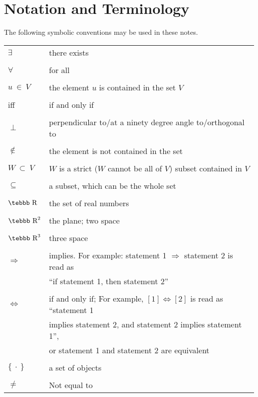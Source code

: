 \pagestyle{myheadings}  
\section*{Notation and Terminology}\label{noter1}

\bigskip

 \quad \quad The following symbolic conventions may be used in these notes.\\
\smallskip

{\tabcolsep=5mm
\begin{tabular}{ll}

  $\exists$ & there exists \\
  &\\
  $ \forall$ & for all \\
  &\\
  $u \ \in \ V $ & the element $u$ is contained in the set $V$ \\
  &\\
  iff & if and only if \\
  &\\
  $\perp$ & perpendicular to/at a ninety degree angle to/orthogonal to \\
  &\\
  $\notin $ & the element is not contained in the set\\
  &\\
  $ W \ \subset \ V$ & $W$ is a strict ($W$ cannot be all of $V$) subset contained in $V$ \\
  &\\
  $\subseteq$ & a subset, which can be the whole set\\
  &\\
  $\mbox{\tebbb R}$ & the set of real numbers\\
  &\\
  $\mbox{\tebbb R}^2$ & the plane; two space\\
  &\\
  $\mbox{\tebbb R}^3$ & three space\\
  &\\
  $\Rightarrow$ & implies.  For example: statement 1 $\Rightarrow$ statement 2  is read as \\ & ``if statement 1, then statement 2''\\
  &\\
  $\Leftrightarrow$ & if and only if;  For example, $[1] \Leftrightarrow [2]$ is read as ``statement 1 \\
  & implies statement 2, and statement 2 implies statement 1'', \\
  & or statement 1 and statement 2 are equivalent\\
  &\\
  $\{ \ \cdot \  \}$ & a set of objects\\
  &\\
  $\neq$  &  Not equal to\\
 \end{tabular}
}

